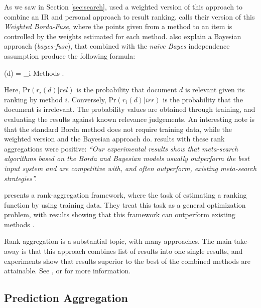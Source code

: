 As we saw in Section \ref{sec:search}, \citet[p3]{Xu2008} used a weighted version
of this approach to combine an IR and personal approach to result ranking.
\citet[p3]{Aslam2001} calls their version of this \emph{Weighted Borda-Fuse},
where the points given from a method to an item is controlled
by the weights estimated for each method.
\citet[p4]{Aslam2001} also explain a Bayesian approach (\emph{bayes-fuse}),
that combined with the \emph{naive Bayes} independence assumption 
produce the following formula:

\begin{eqsp}
  (d)  = \sum_{i \in Methods} \log 
    .
\end{eqsp}

Here, $\mathrm{Pr}(r_i(d) | rel)$ is the probability that document $d$
is relevant given its ranking by method $i$.
Conversely, $\mathrm{Pr}(r_i(d) | irr)$ is the probability that the document 
is irrelevant. The probability values are obtained through training,
and evaluating the results against known relevance judgements.
An interesting note is that the standard Borda method does not require training data,
while the weighted version and the Bayesian approach do.
\citet{Aslam2001} results with these rank aggregations were positive:
\emph{``Our experimental results show that meta-search algorithms based on the 
Borda and Bayesian models usually outperform the best input system 
and are competitive with, and often outperform, 
existing meta-search strategies''.}

\cite{Liu2007} presents a rank-aggregation framework, where
the task of estimating a ranking function by using training data.
They treat this task as a general optimization problem, with results
showing that this framework can outperform existing methods \cite[p7]{Liu2007}.

Rank aggregation is a substantial topic, with many approaches.
The main take-away is that this approach combines list of results
into one single results, and experiments show that results superior
to the best of the combined methods are attainable.
See \cite{Aslam2001}, \cite{Liu2007} or \cite{Klementiev2008} 
for more information.


\subsection{Prediction Aggregation}
\label{sec:theory:predictionagg}

